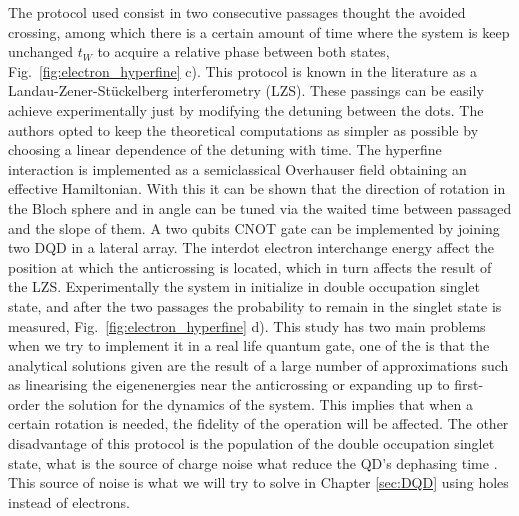 The protocol used consist in two consecutive passages thought the avoided crossing, among which there is a certain amount of time where the system is keep unchanged $t_W$ to acquire a relative phase between both states, Fig.~\ref{fig:electron_hyperfine} c). This protocol is known in the literature as a Landau-Zener-Stückelberg interferometry \cite{Shevchenko2010} (LZS). These passings can be easily achieve experimentally just by modifying the detuning between the dots. The authors opted to keep the theoretical computations as simpler as possible by choosing a linear dependence of the detuning with time. The hyperfine interaction is implemented as a semiclassical Overhauser field obtaining an effective Hamiltonian. With this it can be shown that the direction of rotation in the Bloch sphere and in angle can be tuned via the waited time between passaged and the slope of them. A two qubits CNOT gate can be implemented by joining two DQD in a lateral array. The interdot electron interchange energy affect the position at which the anticrossing is located, which in turn affects the result of the LZS. Experimentally the system in initialize in double occupation singlet state, and after the two passages the probability to remain in the singlet state is measured, Fig.~\ref{fig:electron_hyperfine} d). This study has two main problems when we try to implement it in a real life quantum gate, one of the is that the analytical solutions given are the result of a large number of approximations such as linearising the eigenenergies near the anticrossing or expanding up to first-order the solution for the dynamics of the system. This implies that when a certain rotation is needed, the fidelity of the operation will be affected. The other disadvantage of this protocol is the population of the double occupation singlet state, what is the source of charge noise what reduce the QD's dephasing time \cite{Kuhlmann2013,Fujisawa2000}. This source of noise is what we will try to solve in Chapter \ref{sec:DQD} using holes instead of electrons.


